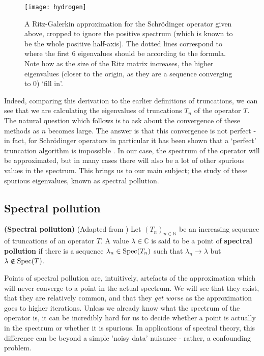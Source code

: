 \documentclass[../main.tex]{subfiles}
\begin{document}
\begin{figure}[p!]
\texttt{[image: hydrogen]}
\caption{A Ritz-Galerkin approximation for the Schr\"odinger operator given above, cropped to ignore the positive spectrum (which is known to be the whole positive half-axis). The dotted lines correspond to where the first 6 eigenvalues should be according to the formula.
Note how as the size of the Ritz matrix increases, the higher eigenvalues (closer to the origin, as they are a sequence converging to 0) `fill in'.}\label{fig:schrodinger-ritz}
\end{figure}
\clearpage


Indeed, comparing this derivation to the earlier definitions of truncations, we can see that we are calculating the eigenvalues of truncations $T_n$ of the
operator $T$. The natural question which follows is to ask about the convergence of these methods as $n$ becomes large. The answer is that this
convergence is not perfect - in fact,  for Schr\"odinger operators in particular it has been shown that a `perfect' truncation algorithm is impossible \cite{colbrook2019how}.
In our case, the spectrum of the operator will be approximated, but in many cases there will also be a lot of other spurious values in the spectrum.
This brings us to our main subject; the study of these spurious eigenvalues, known as spectral pollution.

\subsection{Spectral pollution}

\begin{definition}{\textbf{(Spectral pollution)}}
(Adapted from \parencite{davies1995spectral})
Let $(T_n)_{n \in \mathbb{N}}$ be an increasing sequence of truncations of an operator $T$. A value $\lambda \in \mathbb{C}$ is said to be a point of \textbf{spectral pollution} if there is a sequence $\lambda_n \in \mathrm{Spec}(T_n)$ such that $\lambda_n \rightarrow \lambda$ but $\lambda \notin \mathrm{Spec}(T)$.
\end{definition}

Points of spectral pollution are, intuitively, artefacts of the approximation which will never converge to a point in the actual spectrum. We will see that they exist, that they are relatively common, and that they \emph{get worse} as the approximation goes to higher iterations. Unless we already
know what the spectrum of the operator is, it can be incredibly hard for us to decide whether a point is actually in the spectrum or whether it is
spurious. In applications of spectral theory, this difference can be beyond a simple 'noisy data' nuisance - rather, a confounding problem.
\end{document}
